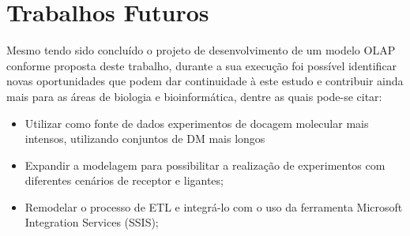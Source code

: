 \chapter{Trabalhos Futuros}
	Mesmo tendo sido concluído o projeto de desenvolvimento de um modelo OLAP conforme proposta deste trabalho, durante a sua execução foi possível identificar novas oportunidades que podem dar continuidade à este estudo e contribuir ainda mais para as áreas de biologia e bioinformática, dentre as quais pode-se citar:

\begin{itemize}
 	\item Utilizar como fonte de dados experimentos de docagem molecular mais intensos, utilizando conjuntos de DM mais longos
 	\item Expandir a modelagem para possibilitar a realização de experimentos com diferentes cenários de receptor e ligantes;
 	\item Remodelar o processo de ETL e integrá-lo com o uso da ferramenta Microsoft Integration Services (SSIS);
\end{itemize}